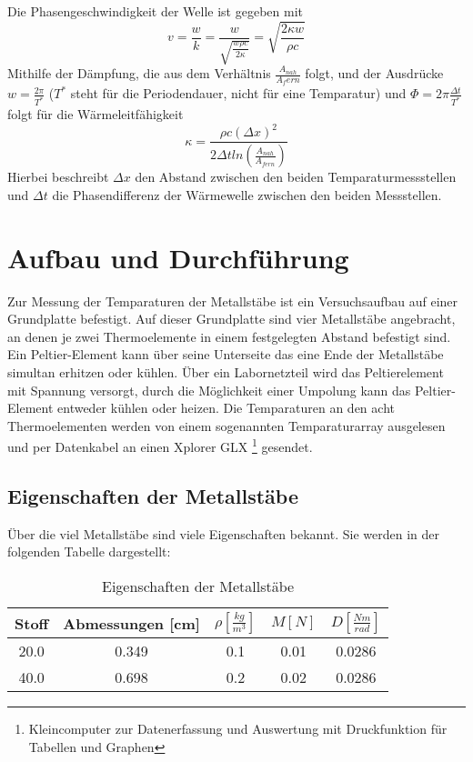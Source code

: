 \documentclass[11pt]{article}
\begin{document}
Die Phasengeschwindigkeit der Welle ist gegeben mit
\begin{equation}
v = \frac{w}{k} = \frac{w}{\sqrt{\frac{w \rho c}{2 \kappa}}} = \sqrt{\frac{2 \kappa w}{\rho c}}
\end{equation}
Mithilfe der Dämpfung, die aus dem Verhältnis $\frac{A_{nah}}{A_fern}$ folgt, und der Ausdrücke $w = \frac{2 \pi}{T^*}$ ($T^*$ steht für die Periodendauer, nicht für eine Temparatur) und $\Phi = 2 \pi \frac{\Delta t}{T^*}$ folgt für die Wärmeleitfähigkeit
\begin{equation}
\kappa = \frac{\rho c (\Delta x)^2}{2 \Delta t ln(\frac{A_{nah}}{A_{fern}})}
\end{equation}
Hierbei beschreibt $\Delta x$ den Abstand zwischen den beiden Temparaturmessstellen und $\Delta t$ die Phasendifferenz der Wärmewelle zwischen den beiden Messstellen.
\section{Aufbau und Durchf\"{u}hrung}
Zur Messung der Temparaturen der Metallstäbe ist ein Versuchsaufbau auf einer Grundplatte befestigt. Auf dieser Grundplatte sind vier Metallstäbe angebracht, an denen je zwei Thermoelemente in einem festgelegten Abstand befestigt sind. Ein Peltier-Element kann über seine Unterseite das eine Ende der Metallstäbe simultan erhitzen oder kühlen. Über ein Labornetzteil wird das Peltierelement mit Spannung versorgt, durch die Möglichkeit einer Umpolung kann das Peltier-Element entweder kühlen oder heizen. Die Temparaturen an den acht Thermoelementen werden von einem sogenannten Temparaturarray ausgelesen und per Datenkabel an einen Xplorer GLX \footnote{Kleincomputer zur Datenerfassung und Auswertung mit Druckfunktion für Tabellen und Graphen} gesendet.
\subsection{Eigenschaften der Metallstäbe}
Über die viel Metallstäbe sind viele Eigenschaften bekannt. Sie werden in der folgenden Tabelle dargestellt:
\begin{table}[h]
\centering
\begin{tabular}{|c|c|c|c|c|}
\hline
Stoff & Abmessungen [cm] & $\rho \left[ \frac{kg}{m^3} \right] $ & $M [N]$ & $ D [\frac{Nm}{rad}]$ \\
\hline
20.0 & 0.349 & 0.1 & 0.01 & 0.0286\\
40.0 & 0.698 & 0.2 & 0.02 & 0.0286\\
\hline
\end{tabular}
\caption{Eigenschaften der Metallstäbe}
\end{table}
\end{document}
